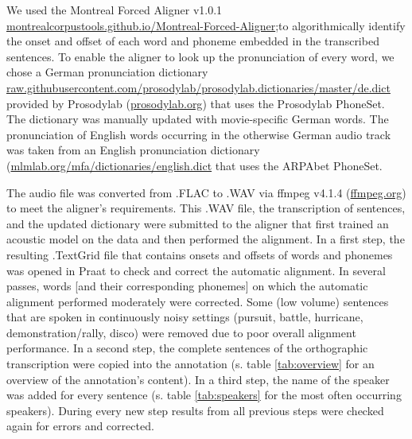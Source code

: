 \documentclass[10pt,a4paper,onecolumn]{article}
\begin{document}
We used the Montreal Forced Aligner v1.0.1
\href{montrealcorpustools.github.io/Montreal-Forced-Aligner}{montrealcorpustools.github.io/Montreal-Forced-Aligner}\citep{mcauliffe2017montreal};to
algorithmically identify the onset and offset of each word and phoneme embedded
in the transcribed sentences. To enable the aligner to look up the pronunciation
of every word, we chose a German pronunciation dictionary
\href{https://raw.githubusercontent.com/prosodylab/prosodylab.dictionaries/master/de.dict}{raw.githubusercontent.com/prosodylab/prosodylab.dictionaries/master/de.dict}
provided by Prosodylab (\href{http://prosodylab.org}{prosodylab.org}) that uses
the Prosodylab PhoneSet. The dictionary was manually updated with movie-specific
German words. The pronunciation of English words occurring in the otherwise
German audio track was taken from an English pronunciation dictionary
(\href{http://mlmlab.org/mfa/dictionaries/english.dict}{mlmlab.org/mfa/dictionaries/english.dict} that uses the ARPAbet PhoneSet.

The audio file was converted from .FLAC to .WAV via ffmpeg v4.1.4
(\href{www.ffmpeg.org}{ffmpeg.org}) to meet the aligner's requirements. This
.WAV file, the transcription of sentences, and the updated dictionary were
submitted to the aligner that first trained an acoustic model on the data and
then performed the alignment. In a first step, the resulting .TextGrid file that
contains onsets and offsets of words and phonemes was opened in Praat to check
and correct the automatic alignment. In several passes, words [and their
corresponding phonemes] on which the automatic alignment performed moderately
were corrected. Some (low volume) sentences that are spoken in continuously
noisy settings (pursuit, battle, hurricane, demonstration/rally, disco) were
removed due to poor overall alignment performance. In a second step, the
complete sentences of the orthographic transcription were copied into the
annotation (s. table \ref{tab:overview} for an overview of the annotation's content). In a third step, the name of the speaker was added for every sentence (s. table \ref{tab:speakers} for the most often occurring speakers).
During every new step results from all previous steps were checked again for errors and corrected.
\end{document}
